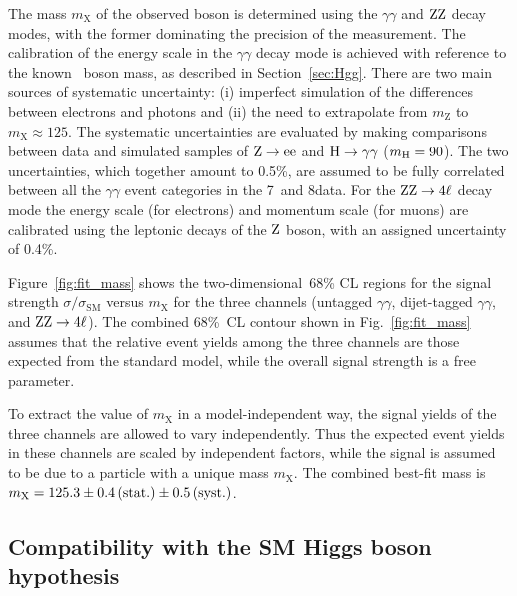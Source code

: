 \documentclass[11pt,twoside,a4paper,cmspaper,final]{cms-tdr}
\begin{document}
The mass $m_{\mathrm{X}}$ of the observed boson is determined using
the $\gamma\gamma$ and $\mathrm{Z}\mathrm{Z}$ decay modes, with the former dominating the precision of the measurement.
The calibration of the energy scale in the $\gamma\gamma$ decay mode is achieved with reference to the known \cPZ\ boson mass, as described in Section~\ref{sec:Hgg}.
There are two main sources of systematic uncertainty: (i) imperfect simulation
of the differences between electrons and photons and (ii)
the need to extrapolate from $m_\mathrm{Z}$ to $m_{\mathrm{X}}\approx 125$\GeV.
The systematic uncertainties are evaluated by making comparisons between data
and simulated samples of $\mathrm{Z}\to\mathrm{e}\mathrm{e}$ and $\mathrm{H}\to\gamma\gamma$
($m_{\mathrm{H}}=90$\GeV).
The two uncertainties, which together amount to 0.5\%, are
assumed to be fully correlated between all the $\gamma\gamma$ event categories in the 7~and
8\TeV data.
For the $\mathrm{Z}\mathrm{Z} \to 4\ell$  decay mode the energy scale (for electrons)
and momentum scale (for muons) are calibrated using the leptonic decays
of the $\mathrm{Z}$ boson, with an assigned uncertainty of 0.4\%.

Figure~\ref{fig:fit_mass} shows the
two-dimensional~68\% CL regions for the signal strength $\sigma/\sigma_\text{SM}$ versus $m_{\mathrm{X}}$ for the three channels
(untagged $\gamma\gamma$, dijet-tagged $\gamma\gamma$, and $\mathrm{Z}\mathrm{Z}\to 4\ell$).
The combined 68\%~CL contour shown  in Fig.~\ref{fig:fit_mass}
assumes that the relative event yields among the three channels are those expected from  the standard model, while the overall signal strength
is a free parameter.

To extract the value of $m_{\mathrm{X}}$ in a model-independent way,
the signal yields of
the three
channels are allowed to vary independently.
Thus the expected event yields in these channels are scaled by independent factors, while
the signal is assumed to be due to a particle with a unique mass $m_{\mathrm{X}}$.
The combined best-fit mass is $m_{\mathrm{X}} = 125.3 \pm 0.4\, (\text{stat.}) \pm 0.5\, (\text{syst.})$\GeV.

\subsection{Compatibility with the SM Higgs boson hypothesis}
\end{document}
